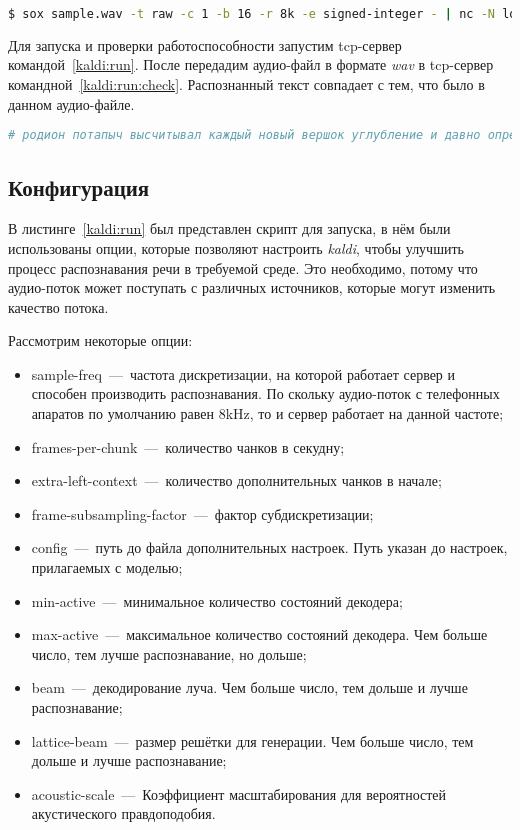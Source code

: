 \begin{lstlisting}[caption={Передача аудио-файла на распознавание речи},label={kaldi:run:check},language=bash]
$ sox sample.wav -t raw -c 1 -b 16 -r 8k -e signed-integer - | nc -N localhost 5050
\end{lstlisting}

Для запуска и проверки работоспособности запустим tcp-сервер командой~\ref{kaldi:run}.
После передадим аудио-файл в формате \textit{wav} в tcp-сервер командной~\ref{kaldi:run:check}.
Распознанный текст совпадает с тем, что было в данном аудио-файле.

\begin{minipage}{\linewidth}
\begin{lstlisting}[caption={Результат работы сервера распознавания речи}, label={kaldi:run:res},language=bash]
# родион потапыч высчитывал каждый новый вершок углубление и давно определил про себя
\end{lstlisting}
\end{minipage}

\subsection{Конфигурация}

В листинге~\ref{kaldi:run} был представлен скрипт для запуска, в нём были
использованы опции, которые позволяют настроить \textit{kaldi}, чтобы улучшить
процесс распознавания речи в требуемой среде. Это необходимо, потому что
аудио-поток может поступать с различных источников, которые могут изменить качество
потока.

Рассмотрим некоторые опции:
\begin{itemize} \label{kaldi:options}
    \item sample-freq~---~частота дискретизации, на которой работает сервер и способен производить распознавания.
        По скольку аудио-поток с телефонных апаратов по умолчанию равен 8kHz, то и сервер работает на данной частоте;
    \item frames-per-chunk~---~количество чанков в секудну;
    \item extra-left-context~---~количество дополнительных чанков в начале;
    \item frame-subsampling-factor~---~фактор субдискретизации;
    \item config~---~путь до файла дополнительных настроек. Путь указан до настроек, прилагаемых с моделью;
    \item min-active~---~минимальное количество состояний декодера;
    \item max-active~---~максимальное количество состояний декодера. Чем больше число, тем лучше распознавание, но дольше;
    \item beam~---~декодирование луча. Чем больше число, тем дольше и лучше распознавание;
    \item lattice-beam~---~размер решётки для генерации. Чем больше число, тем дольше и лучше распознавание;
    \item acoustic-scale~---~Коэффициент масштабирования для вероятностей акустического правдоподобия.
\end{itemize}

